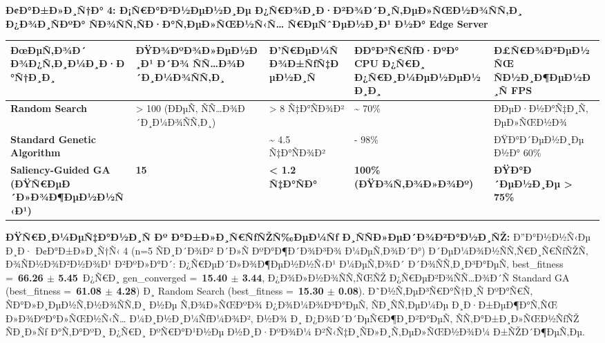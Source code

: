 \documentclass[]{article}
\newcounter{none} %
\begin{document}
\textbf{Ð¢Ð°Ð±Ð»Ð¸Ñ†Ð° 4: Ð¡Ñ€Ð°Ð²Ð½ÐµÐ½Ð¸Ðµ Ð¿Ñ€Ð¾Ð¸Ð·Ð²Ð¾Ð´Ð¸Ñ‚ÐµÐ»ÑŒÐ½Ð¾ÑÑ‚Ð¸ Ð¿Ð¾Ð¸ÑÐºÐ° ÑÐ¾ÑÑ‚ÑÐ·Ð°Ñ‚ÐµÐ»ÑŒÐ½Ñ‹Ñ… Ñ€ÐµÑˆÐµÐ½Ð¸Ð¹ Ð½Ð° Edge Server}

{\def\LTcaptype{none} %
\begin{longtable}[]{@{}
  >{\raggedright\arraybackslash}p{}
  >{\raggedright\arraybackslash}p{}
  >{\raggedright\arraybackslash}p{}
  >{\raggedright\arraybackslash}p{}
  >{\raggedright\arraybackslash}p{}@{}}
\toprule\noalign{}
\begin{minipage}[b]{\linewidth}\raggedright
\textbf{ÐœÐµÑ‚Ð¾Ð´ Ð¾Ð¿Ñ‚Ð¸Ð¼Ð¸Ð·Ð°Ñ†Ð¸Ð¸}
\end{minipage} & \begin{minipage}[b]{\linewidth}\raggedright
\textbf{ÐŸÐ¾ÐºÐ¾Ð»ÐµÐ½Ð¸Ð¹ Ð´Ð¾ ÑÑ…Ð¾Ð´Ð¸Ð¼Ð¾ÑÑ‚Ð¸}
\end{minipage} & \begin{minipage}[b]{\linewidth}\raggedright
\textbf{Ð’Ñ€ÐµÐ¼Ñ Ð¾Ð±ÑƒÑ‡ÐµÐ½Ð¸Ñ}
\end{minipage} & \begin{minipage}[b]{\linewidth}\raggedright
\textbf{ÐÐ°Ð³Ñ€ÑƒÐ·ÐºÐ° CPU Ð¿Ñ€Ð¸ Ð¿Ñ€Ð¸Ð¼ÐµÐ½ÐµÐ½Ð¸Ð¸}
\end{minipage} & \begin{minipage}[b]{\linewidth}\raggedright
\textbf{Ð£Ñ€Ð¾Ð²ÐµÐ½ÑŒ ÑÐ½Ð¸Ð¶ÐµÐ½Ð¸Ñ FPS}
\end{minipage} \\
\midrule\noalign{}
\endhead
\bottomrule\noalign{}
\endlastfoot
\textbf{Random Search} & \textgreater{} 100 (ÐÐµÑ‚ ÑÑ…Ð¾Ð´Ð¸Ð¼Ð¾ÑÑ‚Ð¸) & \textgreater{} 8 Ñ‡Ð°ÑÐ¾Ð² & \textasciitilde{} 70\% & ÐÐµÐ·Ð½Ð°Ñ‡Ð¸Ñ‚ÐµÐ»ÑŒÐ½Ð¾ \\
\textbf{Standard Genetic Algorithm} & 52 & \textasciitilde{} 4.5 Ñ‡Ð°ÑÐ¾Ð² & 95 - 98\% & ÐŸÐ°Ð´ÐµÐ½Ð¸Ðµ Ð½Ð° 60\% \\
\textbf{Saliency-Guided GA (ÐŸÑ€ÐµÐ´Ð»Ð¾Ð¶ÐµÐ½Ð½Ñ‹Ð¹)} & \textbf{15} & \textbf{\textless{} 1.2 Ñ‡Ð°ÑÐ°} & \textbf{100\% (ÐŸÐ¾Ñ‚Ð¾Ð»Ð¾Ðº)} & \textbf{ÐŸÐ°Ð´ÐµÐ½Ð¸Ðµ \textgreater{} 75\%} \\
\end{longtable}
}

\textbf{ÐŸÑ€Ð¸Ð¼ÐµÑ‡Ð°Ð½Ð¸Ñ Ðº Ð°Ð±Ð»Ð¸Ñ€ÑƒÑŽÑ‰ÐµÐ¼Ñƒ Ð¸ÑÑÐ»ÐµÐ´Ð¾Ð²Ð°Ð½Ð¸ÑŽ:} Ð”Ð°Ð½Ð½Ñ‹Ðµ Ð¸Ð· Ð¢Ð°Ð±Ð»Ð¸Ñ†Ñ‹ 4 (n=5 ÑÐ¸Ð´Ð¾Ð² Ð´Ð»Ñ ÐºÐ°Ð¶Ð´Ð¾Ð³Ð¾ Ð¼ÐµÑ‚Ð¾Ð´Ð°) Ð´ÐµÐ¼Ð¾Ð½ÑÑ‚Ñ€Ð¸Ñ€ÑƒÑŽÑ‚ Ð¾ÑÐ½Ð¾Ð²Ð½Ð¾Ð¹ Ð²ÐºÐ»Ð°Ð´: Ð¿Ñ€ÐµÐ´Ð»Ð¾Ð¶ÐµÐ½Ð½Ñ‹Ð¹ Ð¼ÐµÑ‚Ð¾Ð´ Ð´Ð¾ÑÑ‚Ð¸Ð³Ð°ÐµÑ‚ best\_fitness =~\textbf{66.26 $\pm$ 5.45}~Ð¿Ñ€Ð¸ gen\_converged =~\textbf{15.40 $\pm$ 3.44}, Ð¿Ð¾Ð»Ð½Ð¾ÑÑ‚ÑŒÑŽ Ð¿Ñ€ÐµÐ²Ð¾ÑÑ…Ð¾Ð´Ñ Standard GA (best\_fitness =~\textbf{61.08 $\pm$ 4.28}) Ð¸ Random Search (best\_fitness =~\textbf{15.30 $\pm$ 0.08}). Ð˜Ð½Ñ‚ÐµÐ³Ñ€Ð°Ñ†Ð¸Ñ ÐºÐ°Ñ€Ñ‚ ÑÐ°Ð»Ð¸ÐµÐ½Ñ‚Ð½Ð¾ÑÑ‚Ð¸ Ð½Ðµ Ñ‚Ð¾Ð»ÑŒÐºÐ¾ Ð¿Ð¾Ð¼Ð¾Ð³Ð°ÐµÑ‚ ÑÐ¸ÑÑ‚ÐµÐ¼Ðµ Ð¸Ð·Ð±ÐµÐ¶Ð°Ñ‚ÑŒ Ð»Ð¾ÐºÐ°Ð»ÑŒÐ½Ñ‹Ñ… Ð¼Ð¸Ð½Ð¸Ð¼ÑƒÐ¼Ð¾Ð², Ð½Ð¾ Ð¸ Ð¿Ð¾Ð´Ð´ÐµÑ€Ð¶Ð¸Ð²Ð°ÐµÑ‚ ÑÑ‚Ð°Ð±Ð¸Ð»ÑŒÐ½ÑƒÑŽ ÑÐ¸Ð»Ñƒ Ð°Ñ‚Ð°ÐºÐ¸ Ð¿Ñ€Ð¸ ÐºÑ€Ð°Ð¹Ð½Ðµ Ð½Ð¸Ð·ÐºÐ¾Ð¼ Ð²Ñ‹Ñ‡Ð¸ÑÐ»Ð¸Ñ‚ÐµÐ»ÑŒÐ½Ð¾Ð¼ Ð±ÑŽÐ´Ð¶ÐµÑ‚Ðµ.
\end{document}
